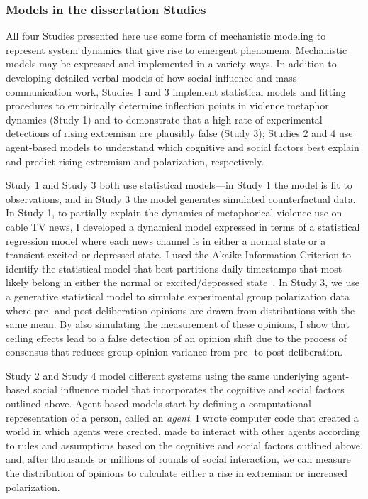 \documentclass[12pt,letterpaper]{article}
\begin{document}
\subsubsection{Models in the dissertation Studies}

All four Studies presented here use some form of mechanistic modeling to 
represent system dynamics that give rise to emergent phenomena. Mechanistic
models may be expressed and implemented in a variety ways. In addition to 
developing detailed verbal models of how social influence and mass
communication work, Studies 1 and 3 implement statistical models and 
fitting procedures to empirically
determine inflection points in violence metaphor dynamics (Study 1) and 
to demonstrate that a high rate of experimental detections of rising extremism
are plausibly false (Study 3); Studies 2 and 4 use 
agent-based models to understand which cognitive and social factors best explain
and predict rising extremism and polarization, respectively.

Study 1 and Study 3 both use statistical models---in Study 1 the model is fit
to observations, and in Study 3 the model generates simulated counterfactual
data. In Study 1, to partially explain the dynamics of metaphorical violence use on cable TV news,
I developed a dynamical model expressed in terms of a statistical regression
model where each news channel is in either a normal state or a 
transient excited or depressed state. I used the Akaike Information 
Criterion to identify the statistical model
that best partitions daily timestamps that most likely belong in either the
normal or excited/depressed state~\cite{Burnham2004,Burnham2011}. 
In Study 3, we use a generative 
statistical model to simulate experimental group polarization data where
pre- and post-deliberation opinions are drawn from distributions with the
same mean. By also simulating the measurement of these opinions, I show
that ceiling effects lead to a false detection of an opinion shift due to
the process of consensus that reduces group opinion variance from
pre- to post-deliberation.

Study 2 and Study 4 model different systems using the same underlying
agent-based social influence model that incorporates the cognitive and social 
factors outlined above. Agent-based
models start by defining a computational representation of a person, called
an \emph{agent}. I wrote computer code that created a world in which agents
were created, made to interact with other agents according to rules and
assumptions based on the cognitive and social factors outlined above, and, 
after thousands or millions of rounds of social interaction, we can measure
the distribution of opinions to calculate either a rise in extremism or
increased polarization.
     
\end{document}
